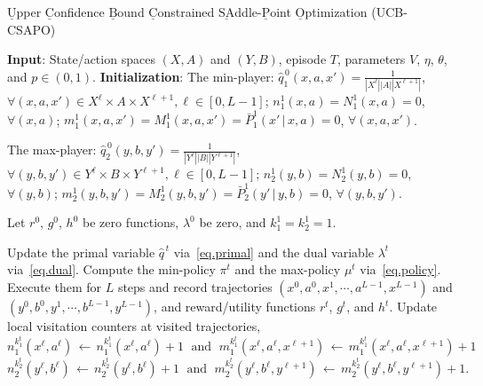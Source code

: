 \documentclass[12pt, final]{l4dc2023}
\begin{document}
\begin{algorithm}[t]
	\caption{ $\underline{\text{U}}$pper $\underline{\text{C}}$onfidence $\underline{\text{B}}$ound 
		$\underline{\text{C}}$onstrained $\underline{\text{SA}}$ddle-$\underline{\text{P}}$oint $\underline{\text{O}}$ptimization (UCB-CSAPO) }
	\label{UCB-MPD}
	\begin{algorithmic}[1]
		\STATE \textbf{Input}: State/action spaces $(X,A)$ and $(Y,B)$, episode $T$, parameters $V$, $\eta$, $\theta$, and $p\in (0,1)$. 
		\STATE \textbf{Initialization}: 	
		The min-player: $\hat q_1^{\,0}(x,a,x') = \frac{1}{|X^\ell| |A||X^{\ell+1}|}$, $\forall(x,a,x')\in X^\ell\times A \times X^{\ell+1}, \ell \in [0, L-1]$; $n_1^1(x,a) = N_1^1(x,a) = 0$, $\forall(x,a)$; $m_1^1(x,a,x') = M_1^1(x,a,x') =\bar P_1^1(x'\,\vert\,x,a) =0$, $\forall(x,a,x')$.
		
		The max-player: $\hat q_2^{\,0}(y,b,y')  = \frac{1}{|Y^\ell| |B||Y^{\ell+1}|}$, $\forall (y,b,y')\in Y^\ell\times B\times Y^{\ell+1}, \ell \in [0, L-1]$; $n_2^1(y,b) = N_2^1(y,b) = 0$, $\forall (y,b)$; $m_2^1(y,b,y') = M_2^1(y,b,y') = \bar P_2^1(y'\,\vert\,y,b) =0$, $\forall (y,b,y')$.
		
		Let $r^0$, $g^0$, $h^0$ be zero functions, $\lambda^{0}$ be zero, and $k_1^1 = k_2^1=1$.
		
		\STATE Update the primal variable $\hat q^{\,t}$ via~\eqref{eq.primal} and the dual variable $\lambda^t$ via~\eqref{eq.dual}.
		\STATE Compute the min-policy $\pi^t$ and the max-policy $\mu^t$ via~\eqref{eq.policy}.
		Execute them for $L$ steps and record trajectories $(x^0,a^0, x^1,\cdots, a^{L-1}, x^{L-1})$ and $(y^0,b^0, y^1,\cdots, b^{L-1}, y^{L-1})$, and reward/utility functions $r^t$, $g^t$, and $h^t$. 
		\STATE  Update local visitation counters at visited trajectories,
		\[
		n_1^{k_1^t} (x^\ell,a^\ell) \,\leftarrow\, n_1^{k_1^t} (x^\ell,a^\ell)+1
		\; 
		\text{ and }
		\;
		m_1^{k_1^t} (x^\ell,a^\ell, x^{\ell+1}) \,\leftarrow\, m_1^{k_1^t} (x^\ell,a^\ell,x^{\ell+1})+1
		\]
		\[
		n_2^{k_2^t} (y^\ell,b^\ell) \,\leftarrow\, n_2^{k_2^t} (y^\ell,b^\ell)+1
		\;
		\text{ and }
		\;
		m_2^{k_2^t} (y^\ell,b^\ell, y^{\ell+1}) \,\leftarrow\, m_2^{k_2^t} (y^\ell,b^\ell,y^{\ell+1})+1.
		\]
		

\end{algorithmic}
\end{algorithm}
\end{document}
